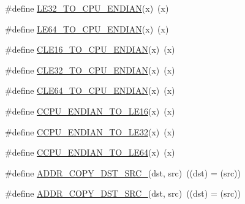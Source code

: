 \begin{DoxyCompactItemize}
\#define \mbox{\hyperlink{group__group__sam0__utils_ga2df63369ef525ba98832132ce5a43346}{L\+E32\+\_\+\+T\+O\+\_\+\+C\+P\+U\+\_\+\+E\+N\+D\+I\+AN}}(x)~(x)
\item 
\#define \mbox{\hyperlink{group__group__sam0__utils_gab675071ce5a4644b205cdbc858417ccd}{L\+E64\+\_\+\+T\+O\+\_\+\+C\+P\+U\+\_\+\+E\+N\+D\+I\+AN}}(x)~(x)
\item 
\#define \mbox{\hyperlink{group__group__sam0__utils_ga4ac6e032d1ce0ae6d2e460da93ce8732}{C\+L\+E16\+\_\+\+T\+O\+\_\+\+C\+P\+U\+\_\+\+E\+N\+D\+I\+AN}}(x)~(x)
\item 
\#define \mbox{\hyperlink{group__group__sam0__utils_ga3ff07a7496222efe8bc7d7b7b0342b0d}{C\+L\+E32\+\_\+\+T\+O\+\_\+\+C\+P\+U\+\_\+\+E\+N\+D\+I\+AN}}(x)~(x)
\item 
\#define \mbox{\hyperlink{group__group__sam0__utils_gacbbba93256e2d892c748d56a42f00f9b}{C\+L\+E64\+\_\+\+T\+O\+\_\+\+C\+P\+U\+\_\+\+E\+N\+D\+I\+AN}}(x)~(x)
\item 
\#define \mbox{\hyperlink{group__group__sam0__utils_ga5fd2d3ed2fc9234277b659b67d33bc64}{C\+C\+P\+U\+\_\+\+E\+N\+D\+I\+A\+N\+\_\+\+T\+O\+\_\+\+L\+E16}}(x)~(x)
\item 
\#define \mbox{\hyperlink{group__group__sam0__utils_ga1e3290451e5c7b98175911c9219b5123}{C\+C\+P\+U\+\_\+\+E\+N\+D\+I\+A\+N\+\_\+\+T\+O\+\_\+\+L\+E32}}(x)~(x)
\item 
\#define \mbox{\hyperlink{group__group__sam0__utils_ga00483bf27ea1e8a2143c6baf22b31f16}{C\+C\+P\+U\+\_\+\+E\+N\+D\+I\+A\+N\+\_\+\+T\+O\+\_\+\+L\+E64}}(x)~(x)
\item 
\#define \mbox{\hyperlink{group__group__sam0__utils_gac4609178e5c825e815f44fa123dcaaf7}{A\+D\+D\+R\+\_\+\+C\+O\+P\+Y\+\_\+\+D\+S\+T\+\_\+\+S\+R\+C\+\_}}(dst,  src)~((dst) = (src))
\item 
\#define \mbox{\hyperlink{group__group__sam0__utils_ga0454afa80924c2183c8c672c043440cc}{A\+D\+D\+R\+\_\+\+C\+O\+P\+Y\+\_\+\+D\+S\+T\+\_\+\+S\+R\+C\+\_}}(dst,  src)~((dst) = (src))
\end{DoxyCompactItemize}
